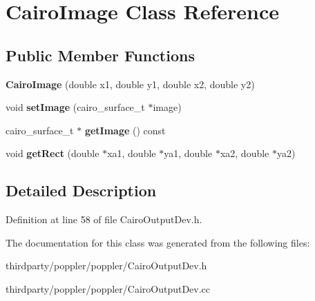 \hypertarget{class_cairo_image}{}\section{Cairo\+Image Class Reference}
\label{class_cairo_image}
\subsection*{Public Member Functions}
\begin{DoxyCompactItemize}
\item 
\mbox{\label{class_cairo_image_a6c00a1282d3cce3cc92a737095959ca3}} 
{\bfseries Cairo\+Image} (double x1, double y1, double x2, double y2)
\item 
\mbox{\label{class_cairo_image_a83a003600da8634bbf82660f8ad108dd}} 
void {\bfseries set\+Image} (cairo\+\_\+surface\+\_\+t $\ast$image)
\item 
\mbox{\label{class_cairo_image_a2f8bbe37ff37792cf8b23d0efda9d509}} 
cairo\+\_\+surface\+\_\+t $\ast$ {\bfseries get\+Image} () const
\item 
\mbox{\label{class_cairo_image_a48b81b5318a693b81a146bdeda46afa6}} 
void {\bfseries get\+Rect} (double $\ast$xa1, double $\ast$ya1, double $\ast$xa2, double $\ast$ya2)
\end{DoxyCompactItemize}


\subsection{Detailed Description}


Definition at line 58 of file Cairo\+Output\+Dev.\+h.



The documentation for this class was generated from the following files\+:\begin{DoxyCompactItemize}
\item 
thirdparty/poppler/poppler/Cairo\+Output\+Dev.\+h\item 
thirdparty/poppler/poppler/Cairo\+Output\+Dev.\+cc\end{DoxyCompactItemize}
